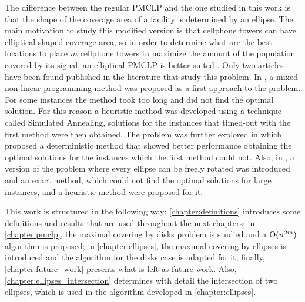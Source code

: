 The difference between the regular PMCLP and the one studied in this work is that the shape of the coverage area of a facility is determined by an ellipse. The main motivation to study this modified version is that cellphone towers can have elliptical shaped coverage area, so in order to determine what are the best locations to place $m$ cellphone towers to maximize the amount of the population covered by its signal, an elliptical PMCLP is better suited \cite{canbolat}. Only two articles have been found published in the literature that study this problem. In \cite{canbolat}, a mixed non-linear programming method was proposed as a first approach to the problem. For some instances the method took too long and did not find the optimal solution. For this reason a heuristic method was developed using a technique called Simulated Annealing, solutions for the instances that timed-out with the first method were then obtained. The problem was further explored in \cite{andreta} which proposed a deterministic method that showed better performance obtaining the optimal solutions for the instances which the first method could not. Also, in \cite{andreta}, a version of the problem where every ellipse can be freely rotated was introduced and an exact method, which could not find the optimal solutions for large instances, and a heuristic method were proposed for it.

This work is structured in the following way: \autoref{chapter:definitions} introduces some definitions and results that are used throughout the next chapters; in \autoref{chapter:pmclp}, the maximal covering by disks problem is studied and a $\mathrm{O}(n^{2m})$ algorithm is proposed; in \autoref{chapter:ellipses}, the maximal covering by ellipses is introduced and the algorithm for the disks case is adapted for it; finally, \autoref{chapter:future_work} presents what is left as future work. Also, \autoref{chapter:ellipses_intersection} determines with detail the intersection of two ellipses, which is used in the algorithm developed in \autoref{chapter:ellipses}.

